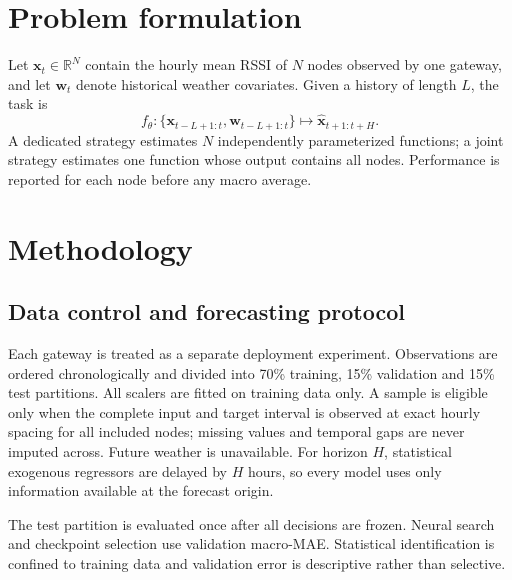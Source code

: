 \documentclass[preprint,12pt]{elsarticle}
\begin{document}
\section{Problem formulation}
Let $\mathbf{x}_t\in\mathbb{R}^{N}$ contain the hourly mean RSSI of $N$ nodes observed
by one gateway, and let $\mathbf{w}_t$ denote historical weather covariates. Given a
history of length $L$, the task is
\begin{equation}
 f_\theta:\{\mathbf{x}_{t-L+1:t},\mathbf{w}_{t-L+1:t}\}
 \mapsto \widehat{\mathbf{x}}_{t+1:t+H}.
\end{equation}
A dedicated strategy estimates $N$ independently parameterized functions; a joint
strategy estimates one function whose output contains all nodes. Performance is
reported for each node before any macro average.

\section{Methodology}
\subsection{Data control and forecasting protocol}
Each gateway is treated as a separate deployment experiment. Observations are ordered
chronologically and divided into 70\% training, 15\% validation and 15\% test
partitions. All scalers are fitted on training data only. A sample is eligible only
when the complete input and target interval is observed at exact hourly spacing for
all included nodes; missing values and temporal gaps are never imputed across. Future
weather is unavailable. For horizon $H$, statistical exogenous regressors are delayed
by $H$ hours, so every model uses only information available at the forecast origin.

The test partition is evaluated once after all decisions are frozen. Neural search and
checkpoint selection use validation macro-MAE. Statistical identification is confined
to training data and validation error is descriptive rather than selective.
\end{document}
